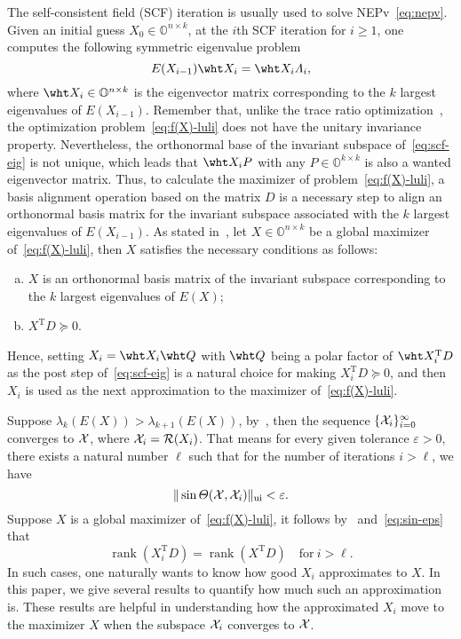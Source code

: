 \documentclass[11pt]{article}
\def\bbO{\mathbb{O}}
\def\cR{{\cal R}}
\def\cX{{\cal X}}
\DeclareMathOperator{\rank}{rank}
\DeclareMathOperator{\T}{T}
\DeclareMathOperator{\UI}{ui}
\theoremstyle{definition}
\numberwithin{equation}{section}
\numberwithin{figure}{section}
\numberwithin{table}{section}
\begin{document}
The self-consistent field (SCF) iteration is usually used to solve NEPv~\eqref{eq:nepv}.
Given an initial guess $X_0\in\bbO^{n\times k}$, at the $i$th SCF iteration for $i\ge 1$, one computes
the following symmetric eigenvalue problem
\begin{equation} \label{eq:scf-eig}
    E(X_{i-1})\wht X_i=\wht X_i\Lambda_i,
\end{equation}
where $\wht X_i\in\bbO^{n\times k}$ is the eigenvector matrix corresponding to the $k$ largest eigenvalues of $E(X_{i-1})$.
Remember that, unlike the trace ratio optimization~\cite{zhli:15a, zhln:2010},
the optimization problem~\eqref{eq:f(X)-luli} does not have the unitary invariance property.
Nevertheless, the orthonormal base of the invariant subspace of~\eqref{eq:scf-eig} is not unique,
which leads that $\wht X_iP$ with any $P\in\bbO^{k\times k}$ is also a wanted eigenvector matrix.
Thus, to calculate the maximizer of problem~\eqref{eq:f(X)-luli},
a basis alignment operation based on the matrix $D$ is a necessary step to align an orthonormal basis matrix
for the invariant subspace associated with the $k$ largest eigenvalues of $E(X_{i-1})$.
As stated in~\cite{luli:22,wazl:22}, let $X\in\bbO^{n\times k}$ be a global maximizer of~\eqref{eq:f(X)-luli},
then $X$ satisfies the necessary conditions as follows:
\begin{enumerate}[(a)]
    \item $X$ is an orthonormal basis matrix of the invariant subspace corresponding to the $k$ largest eigenvalues of $E(X)$;
    \item $X^{\T}D\succeq 0$.
\end{enumerate}
Hence, setting $X_i=\wht X_i\wht Q$ with $\wht Q$ being a polar factor of $\wht X_i^{\T}D$
as the post step of~\eqref{eq:scf-eig} is a natural choice for making $X_i^{\T}D\succeq 0$,
and then $X_i$ is used as the next approximation to the maximizer of~\eqref{eq:f(X)-luli}.

Suppose $\lambda_k\left(E(X)\right)>\lambda_{k+1}\left(E(X)\right)$, by~\cite[Theorem~4.3]{wazl:22}, then the sequence
$\{\cX_i\}_{i=0}^{\infty}$ converges to $\cX$, where $\cX_i=\cR(X_i)$.
That means for every given tolerance $\varepsilon>0$, there exists a natural number $\ell$ such that
for the number of iterations $i>\ell$, we have
\begin{equation}\label{eq:sin-eps}
\|\sin\Theta(\cX,\cX_i)\|_{\UI}<\varepsilon.
\end{equation}
Suppose $X$ is a global maximizer of~\eqref{eq:f(X)-luli},  it follows by~\cite[Lemma~5.1]{luli:22} and~\eqref{eq:sin-eps} that
\[\rank(X_i^{\T}D)=\rank(X^{\T}D)\quad\mbox{for}\ i>\ell. \]
In such cases, one naturally wants to know how good $X_i$ approximates to $X$.
In this paper, we give several results to quantify how much such an approximation is.
These results are helpful in understanding how the approximated $X_i$ move to the maximizer $X$
when the subspace $\cX_i$ converges to $\cX$.
\end{document}
